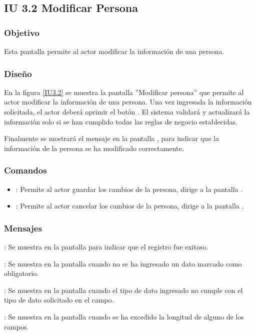 \subsection{IU 3.2 Modificar Persona}

\subsubsection{Objetivo}
	Esta pantalla permite al actor modificar la información de una persona.
\subsubsection{Diseño}
	En la figura \ref{IU3.2} se muestra la pantalla ''Modificar persona'' que permite al actor modificar la información de una persona.
	Una vez ingresada la información solicitada, el actor deberá oprimir el botón  . El sistema validará y actualizará la información solo si se han cumplido todas las reglas de negocio establecidas.
	
	Finalmente se mostrará el mensaje  en la pantalla , para indicar que la información de la persona se ha modificado correctamente.

\label{IU3.2}
\subsubsection{Comandos}
\begin{itemize}
	\item {}: Permite al actor guardar los cambios de la persona, dirige a la pantalla .
	\item {}: Permite al actor cancelar los cambios de la persona, dirige a la pantalla .
\end{itemize}

\subsubsection{Mensajes}

\begin{Citemize}
	\item {}: Se muestra en la pantalla  para indicar que el registro fue exitoso.
	\item {}: Se muestra en la pantalla  cuando no se ha ingresado un dato marcado como obligatorio.
	\item {}: Se muestra en la pantalla  cuando el tipo de dato ingresado no cumple con el tipo de dato solicitado en el campo.
	\item {}: Se muestra en la pantalla  cuando se ha excedido la longitud de alguno de los campos.
\end{Citemize}
